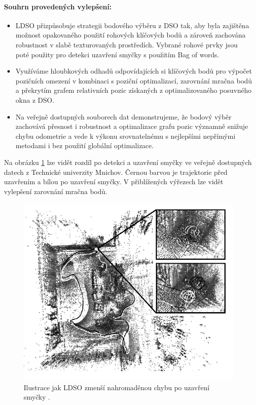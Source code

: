\documentclass[12pt,a4paper]{report}
\begin{document}
\paragraph*{Souhrn provedených vylepšení:}
\begin{itemize}
\item LDSO přizpůsobuje strategii bodového výběru z DSO tak, aby byla zajištěna mož\-nost opakovaného použití rohových klíčových bodů a zároveň zachována robustnost v slabě texturovaných prostředích. Vybrané rohové prvky jsou poté použity pro detekci uzavření smyčky s použitím Bag of words.
\item Využíváme hloubkových odhadů odpovídajících si klíčových bodů pro výpočet \newline pozičních omezení v kombinaci s poziční optimalizací, zarovnání mračna bodů a překrytím grafem relativních pozic získaných z optimalizovaného posuvného okna z DSO.
\item Na veřejně dostupných souborech dat demonstrujeme, že bodový výběr zachovává přesnost i robustnost a optimalizace grafu pozic významně snižuje chybu odometrie a vede k výkonu srovnatelnému s nejlepšími nepřímými metodami i bez použití globální optimalizace.
\end{itemize}

Na obrázku \ref{8} lze vidět rozdíl po detekci a uzavření smyčky ve veřejně dostupných datech z Technické univerzity Mnichov. Černou barvou je trajektorie před uzavřením a bílou po uzavření smyčky. V přiblížených výřezech lze vidět vylepšení zarovnání mračna bodů.

\begin{figure}[H]
\centering
\includegraphics[scale=0.75]{img/Obr6_b.png}
\caption{Ilustrace jak LDSO zmenší nahromaděnou chybu po uzavření smyčky \cite{LDSO}.}
\label{8}
\end{figure}
\end{document}
